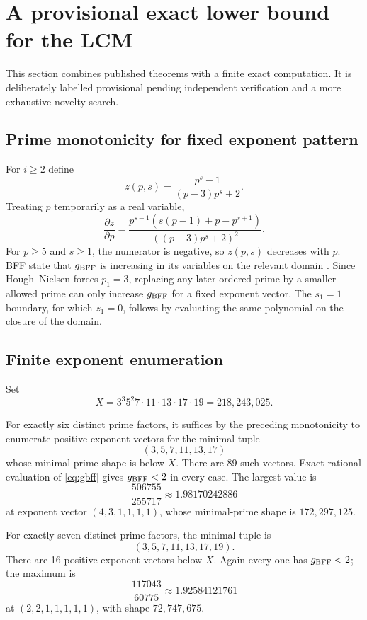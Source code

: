 \documentclass[11pt]{article}
\theoremstyle{definition}
\begin{document}
\section{A provisional exact lower bound for the LCM}\label{sec:218m}

This section combines published theorems with a finite exact computation.  It is deliberately
labelled provisional pending independent verification and a more exhaustive novelty search.

\subsection{Prime monotonicity for fixed exponent pattern}

For $i\ge2$ define
\[
 z(p,s)=\frac{p^s-1}{(p-3)p^s+2}.
\]
Treating $p$ temporarily as a real variable,
\begin{equation}\label{eq:zderivative}
 \frac{\partial z}{\partial p}
 =\frac{p^{s-1}\left(s(p-1)+p-p^{s+1}\right)}{\left((p-3)p^s+2\right)^2}.
\end{equation}
For $p\ge5$ and $s\ge1$, the numerator is negative, so $z(p,s)$ decreases with $p$.
BFF state that $g_{\rm BFF}$ is increasing in its variables on the relevant domain
\cite{BFF1987}.  Since Hough--Nielsen forces $p_1=3$, replacing any later ordered prime by a
smaller allowed prime can only increase $g_{\rm BFF}$ for a fixed exponent vector.  The
$s_1=1$ boundary, for which $z_1=0$, follows by evaluating the same polynomial on the closure of
the domain.

\subsection{Finite exponent enumeration}

Set
\begin{equation}\label{eq:X}
 X=3^3 5^2 7\cdot11\cdot13\cdot17\cdot19
  =218{,}243{,}025.
\end{equation}

For exactly six distinct prime factors, it suffices by the preceding monotonicity to enumerate
positive exponent vectors for the minimal tuple
\[
 (3,5,7,11,13,17)
\]
whose minimal-prime shape is below $X$.  There are 89 such vectors.  Exact rational evaluation
of \eqref{eq:gbff} gives $g_{\rm BFF}<2$ in every case.  The largest value is
\[
 \frac{506755}{255717}\approx1.98170242886
\]
at exponent vector $(4,3,1,1,1,1)$, whose minimal-prime shape is $172{,}297{,}125$.

For exactly seven distinct prime factors, the minimal tuple is
\[
 (3,5,7,11,13,17,19).
\]
There are 16 positive exponent vectors below $X$.  Again every one has $g_{\rm BFF}<2$; the
maximum is
\[
 \frac{117043}{60775}\approx1.92584121761
\]
at $(2,2,1,1,1,1,1)$, with shape $72{,}747{,}675$.
\end{document}
